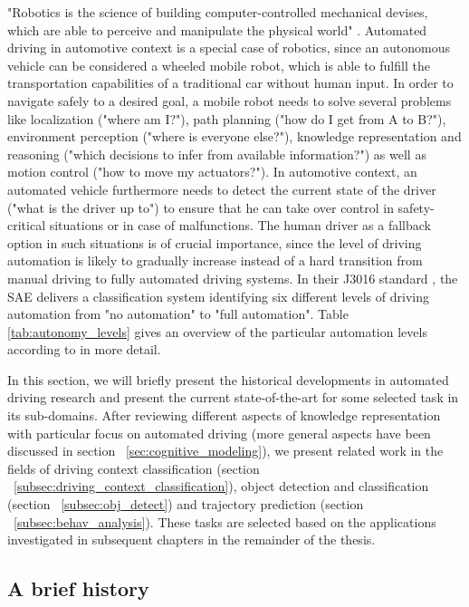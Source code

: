 "Robotics is the science of building computer-controlled mechanical devises, which are able to perceive and manipulate the physical world" \cite{Thrun2005}.
Automated driving in automotive context is a special case of robotics, since an autonomous vehicle can be considered a wheeled mobile robot, which is able to fulfill the transportation capabilities of a traditional car without human input.
In order to navigate safely to a desired goal, a mobile robot needs to solve several problems like localization ("where am I?"), path planning ("how do I get from A to B?"), environment perception ("where is everyone else?"), knowledge representation and reasoning ("which decisions to infer from available information?") as well as motion control ("how to move my actuators?").
In automotive context, an automated vehicle furthermore needs to detect the current state of the driver ("what is the driver up to") to ensure that he can take over control in safety-critical situations or in case of malfunctions.
The human driver as a fallback option in such situations is of crucial importance, since the level of driving automation is likely to gradually increase instead of a hard transition from manual driving to fully automated driving systems.
In their J3016 standard \cite{SAE_J3016}, the \ac{SAE} delivers a classification system identifying six different levels of driving automation from "no automation" to "full automation".
Table \ref{tab:autonomy_levels} gives an overview of the particular automation levels according to \cite{SAE_J3016} in more detail.

In this section, we will briefly present the historical developments in automated driving research and present the current state-of-the-art for some selected task in its sub-domains.
After reviewing different aspects of knowledge representation with particular focus on automated driving (more general aspects have been discussed in section ~\ref{sec:cognitive_modeling}), we present related work in the fields of driving context classification (section ~\ref{subsec:driving_context_classification}), object detection and classification (section ~\ref{subsec:obj_detect}) and trajectory prediction (section ~\ref{subsec:behav_analysis}). 
These tasks are selected based on the applications investigated in subsequent chapters in the remainder of the thesis.


\subsection{A brief history}
\label{subsec:aut_driving_hist}

